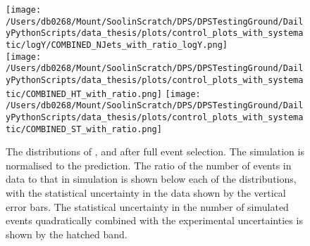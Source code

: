 \begin{figure}[hp!]
	\centering
	\texttt{[image: /Users/db0268/Mount/SoolinScratch/DPS/DPSTestingGround/DailyPythonScripts/data\_thesis/plots/control\_plots\_with\_systematic/logY/COMBINED\_NJets\_with\_ratio\_logY.png]} \\
	\texttt{[image: /Users/db0268/Mount/SoolinScratch/DPS/DPSTestingGround/DailyPythonScripts/data\_thesis/plots/control\_plots\_with\_systematic/COMBINED\_HT\_with\_ratio.png]}
	\texttt{[image: /Users/db0268/Mount/SoolinScratch/DPS/DPSTestingGround/DailyPythonScripts/data\_thesis/plots/control\_plots\_with\_systematic/COMBINED\_ST\_with\_ratio.png]} \\
	\caption[The distributions of \NJET{}, \HT{} and \ST{} after full event selection. The \ttbar{} simulation is normalised to the \NNLO{} prediction. The ratio of the number of events in data to that in simulation is shown below each of the distributions, with the statistical uncertainty in the data shown by the vertical error bars. The statistical uncertainty in the number of simulated events quadratically combined with the experimental uncertainties is shown by the hatched band.]{The distributions of \NJET{}, \HT{} and \ST{} after full event selection. The \ttbar{} simulation is normalised to the \NNLO{} prediction. The ratio of the number of events in data to that in simulation is shown below each of the distributions, with the statistical uncertainty in the data shown by the vertical error bars. The statistical uncertainty in the number of simulated events quadratically combined with the experimental uncertainties is shown by the hatched band.}
	\label{fig:combControlPlot1}
\end{figure}

